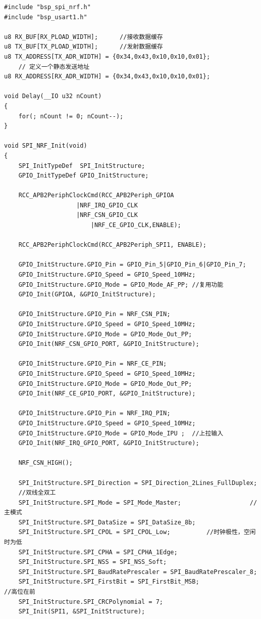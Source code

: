 \documentclass[UTF8,a4paper,11pt]{article}
\begin{document}
\begin{lstlisting}[caption={}]
#include "bsp_spi_nrf.h"
#include "bsp_usart1.h"

u8 RX_BUF[RX_PLOAD_WIDTH];		//接收数据缓存
u8 TX_BUF[TX_PLOAD_WIDTH];		//发射数据缓存
u8 TX_ADDRESS[TX_ADR_WIDTH] = {0x34,0x43,0x10,0x10,0x01};  
	// 定义一个静态发送地址
u8 RX_ADDRESS[RX_ADR_WIDTH] = {0x34,0x43,0x10,0x10,0x01}; 

void Delay(__IO u32 nCount)
{
  	for(; nCount != 0; nCount--);
} 

void SPI_NRF_Init(void)  
{
	SPI_InitTypeDef  SPI_InitStructure;
  	GPIO_InitTypeDef GPIO_InitStructure;
  
  	RCC_APB2PeriphClockCmd(RCC_APB2Periph_GPIOA
                 	|NRF_IRQ_GPIO_CLK
                   	|NRF_CSN_GPIO_CLK
                    	|NRF_CE_GPIO_CLK,ENABLE);

  	RCC_APB2PeriphClockCmd(RCC_APB2Periph_SPI1, ENABLE);

  	GPIO_InitStructure.GPIO_Pin = GPIO_Pin_5|GPIO_Pin_6|GPIO_Pin_7;
  	GPIO_InitStructure.GPIO_Speed = GPIO_Speed_10MHz;
  	GPIO_InitStructure.GPIO_Mode = GPIO_Mode_AF_PP; //复用功能
  	GPIO_Init(GPIOA, &GPIO_InitStructure);  

  	GPIO_InitStructure.GPIO_Pin = NRF_CSN_PIN;
  	GPIO_InitStructure.GPIO_Speed = GPIO_Speed_10MHz;
  	GPIO_InitStructure.GPIO_Mode = GPIO_Mode_Out_PP;
  	GPIO_Init(NRF_CSN_GPIO_PORT, &GPIO_InitStructure);
  
  	GPIO_InitStructure.GPIO_Pin = NRF_CE_PIN;
  	GPIO_InitStructure.GPIO_Speed = GPIO_Speed_10MHz;
  	GPIO_InitStructure.GPIO_Mode = GPIO_Mode_Out_PP;
  	GPIO_Init(NRF_CE_GPIO_PORT, &GPIO_InitStructure);
  
  	GPIO_InitStructure.GPIO_Pin = NRF_IRQ_PIN;
  	GPIO_InitStructure.GPIO_Speed = GPIO_Speed_10MHz;
  	GPIO_InitStructure.GPIO_Mode = GPIO_Mode_IPU ;  //上拉输入
  	GPIO_Init(NRF_IRQ_GPIO_PORT, &GPIO_InitStructure); 
		  
  	NRF_CSN_HIGH(); 
 
  	SPI_InitStructure.SPI_Direction = SPI_Direction_2Lines_FullDuplex; 
	//双线全双工
  	SPI_InitStructure.SPI_Mode = SPI_Mode_Master;	 				//主模式
  	SPI_InitStructure.SPI_DataSize = SPI_DataSize_8b;	 				
  	SPI_InitStructure.SPI_CPOL = SPI_CPOL_Low;		 	//时钟极性，空闲时为低
  	SPI_InitStructure.SPI_CPHA = SPI_CPHA_1Edge;	
  	SPI_InitStructure.SPI_NSS = SPI_NSS_Soft;		   					
  	SPI_InitStructure.SPI_BaudRatePrescaler = SPI_BaudRatePrescaler_8;  
  	SPI_InitStructure.SPI_FirstBit = SPI_FirstBit_MSB;  				//高位在前
  	SPI_InitStructure.SPI_CRCPolynomial = 7;
  	SPI_Init(SPI1, &SPI_InitStructure);


\end{lstlisting}
\end{document}
